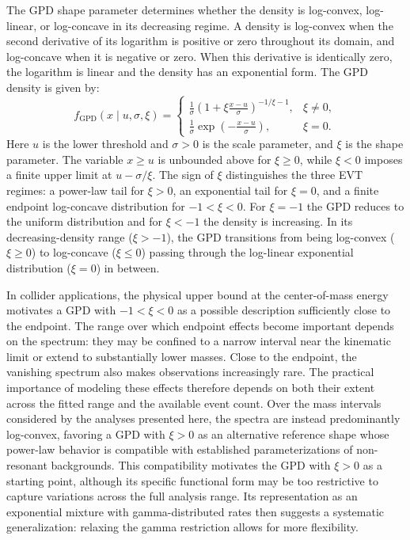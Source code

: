 \documentclass[a4paper,11pt]{article}
\begin{document}
The GPD shape parameter determines whether the density is log-convex, log-linear, or log-concave in its decreasing regime. A density is log-convex when the second derivative of its logarithm is positive or zero throughout its domain, and log-concave when it is negative or zero. When this derivative is identically zero, the logarithm is linear and the density has an exponential form. The GPD density is given by:
\begin{equation}
    f_{\mathrm{GPD}}(x \mid u,\sigma,\xi) =
    \begin{cases}
        \displaystyle
        \frac{1}{\sigma}
        \left(1+\xi\frac{x-u}{\sigma}\right)^{-1/\xi-1},
        & \xi \ne 0, \\[6pt]
        \displaystyle
        \frac{1}{\sigma}
        \exp\left(-\frac{x-u}{\sigma}\right),
        & \xi = 0.
    \end{cases}
    \label{eq:gpd}
\end{equation}
Here $u$ is the lower threshold and $\sigma>0$ is the scale parameter,
and $\xi$ is the shape parameter. The variable $x\ge u$ is unbounded
above for $\xi\ge0$, while $\xi<0$ imposes a finite upper limit at
$u-\sigma/\xi$. The sign of $\xi$ distinguishes the three EVT regimes:
a power-law tail for $\xi>0$, an exponential tail for $\xi=0$, and a finite endpoint log-concave distribution for $-1<\xi<0$. For $\xi=-1$ the GPD reduces to the uniform distribution and for $\xi<-1$ the density is increasing. In its decreasing-density range ($\xi>-1$), the GPD transitions from being log-convex ($\xi\geq0$) to log-concave ($\xi\leq0$) passing through the log-linear exponential distribution ($\xi=0$) in between.

In collider applications, the physical upper bound at the center-of-mass energy motivates a GPD with $-1<\xi<0$ as a possible description sufficiently close to the endpoint. The range over which endpoint effects become important depends on the spectrum: they may be confined to a narrow interval near the kinematic limit or extend to substantially lower masses. Close to the endpoint, the vanishing spectrum also makes observations increasingly rare. The practical importance of modeling these effects therefore depends on both their extent across the fitted range and the available event count. Over the mass intervals considered by the analyses presented here, the spectra are instead predominantly log-convex, favoring a GPD with $\xi>0$ as an alternative reference shape whose power-law behavior is compatible with established parameterizations of non-resonant backgrounds. This compatibility motivates the GPD with $\xi>0$ as a starting point, although its specific functional form may be too restrictive to capture variations across the full analysis range. Its representation as an exponential mixture with gamma-distributed rates then suggests a systematic generalization: relaxing the gamma restriction allows for more flexibility.
\end{document}

